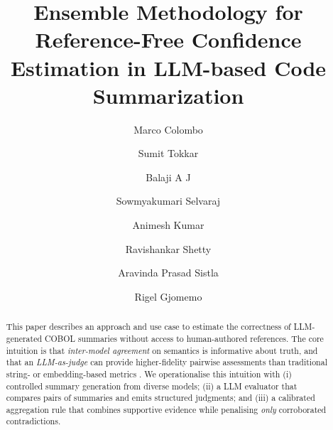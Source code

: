 \documentclass[sigconf,nonacm]{acmart}
\title{Ensemble Methodology for Reference-Free Confidence Estimation in LLM-based Code Summarization}
\author{Marco Colombo}
\author{Sumit Tokkar}
\affiliation{%
  \institution{University of Illinois Urbana-Champaign}
  \country{}
}
\author{Balaji A J}
\author{Sowmyakumari Selvaraj}
\author{Animesh Kumar}
\author{Ravishankar Shetty}
\affiliation{%
  \institution{Infosys}
  \country{}
}
\author{Aravinda Prasad Sistla}
\author{Rigel Gjomemo}
\affiliation{%
  \institution{University of Illinois Chicago}
  \country{}
}
\begin{document}
\begin{abstract}
This paper describes an approach and use case to estimate the correctness of LLM-generated COBOL summaries without access to human-authored references. The core intuition is that \emph{inter-model agreement} on semantics is informative about truth, and that an \emph{LLM-as-judge}
can provide higher-fidelity pairwise assessments than traditional
string- or embedding-based metrics
\cite{wu2024largelanguagemodelsserve,robinson2025simpleeffectivebaselinescode}.
We operationalise this intuition with (i) controlled summary generation
from diverse models; (ii) a LLM evaluator that compares
pairs of summaries and emits structured judgments; and (iii) a
calibrated aggregation rule that combines supportive evidence while
penalising \emph{only} corroborated contradictions.
\end{abstract}
\maketitle
 













\newpage

\end{document}
